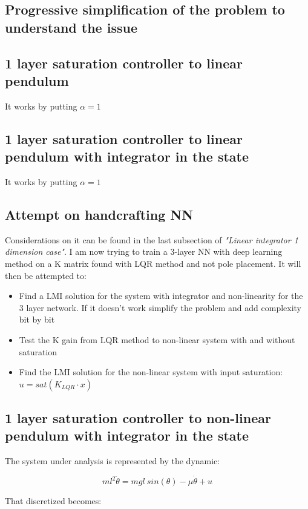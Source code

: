 \documentclass{article}
\begin{document}
\subsection*{Progressive simplification of the problem to understand the issue}

\subsection*{1 layer saturation controller to linear pendulum}

It works by putting $\alpha = 1$

\subsection*{1 layer saturation controller to linear pendulum with integrator in the state}

It works by putting $\alpha = 1$

\subsection*{Attempt on handcrafting NN}
Considerations on it can be found in the last subsection of \textit{"Linear integrator 1 dimension case"}.
I am now trying to train a 3-layer NN with deep learning method on a K matrix found with LQR method and not pole placement. It will then be attempted to:
\begin{itemize}
  \item Find a LMI solution for the system with integrator and non-linearity for the 3 layer network. If it doesn't work simplify the problem and add complexity bit by bit
  \item Test the K gain from LQR method to non-linear system with and without saturation
  \item Find the LMI solution for the non-linear system with input saturation: $u = sat(K_{LQR} \cdot x)$
\end{itemize}

\subsection*{1 layer saturation controller to non-linear pendulum with integrator in the state}
The system under analysis is represented by the dynamic:

$$
m l^{2} \ddot{\theta} = m g l\ sin(\theta) - \mu \dot{\theta} + u
$$

That discretized becomes:
\end{document}
